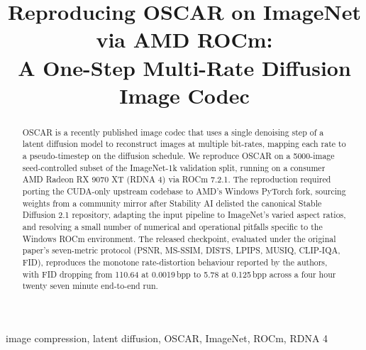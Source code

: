 \documentclass[conference]{IEEEtran}
\begin{document}
\title{Reproducing OSCAR on ImageNet via AMD ROCm:\\ A One-Step Multi-Rate Diffusion Image Codec}

\author{
\and
{}
}

\maketitle

\begin{abstract}
OSCAR is a recently published image codec that uses a single denoising
step of a latent diffusion model to reconstruct images at multiple
bit-rates, mapping each rate to a pseudo-timestep on the diffusion
schedule. We reproduce OSCAR on a 5000-image seed-controlled subset of
the ImageNet-1k validation split, running on a consumer AMD Radeon RX
9070 XT (RDNA 4) via ROCm 7.2.1. The reproduction required porting the
CUDA-only upstream codebase to AMD's Windows PyTorch fork, sourcing
weights from a community mirror after Stability AI delisted the
canonical Stable Diffusion 2.1 repository, adapting the input pipeline
to ImageNet's varied aspect ratios, and resolving a small number of
numerical and operational pitfalls specific to the Windows ROCm
environment. The released checkpoint, evaluated under the original
paper's seven-metric protocol (PSNR, MS-SSIM, DISTS, LPIPS, MUSIQ,
CLIP-IQA, FID), reproduces the monotone rate-distortion behaviour
reported by the authors, with FID dropping from 110.64 at 0.0019\,bpp
to 5.78 at 0.125\,bpp across a four hour twenty seven minute
end-to-end run.
\end{abstract}

\begin{IEEEkeywords}
image compression, latent diffusion, OSCAR, ImageNet, ROCm, RDNA 4
\end{IEEEkeywords}

\end{document}
